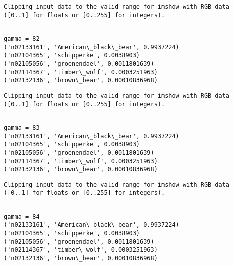 \documentclass[11pt]{article}
\begin{document}
    \begin{Verbatim}[commandchars=\\\{\}]
Clipping input data to the valid range for imshow with RGB data ([0..1] for floats or [0..255] for integers).

    \end{Verbatim}

    \begin{Verbatim}[commandchars=\\\{\}]

gamma = 82
('n02133161', 'American\_black\_bear', 0.9937224)
('n02104365', 'schipperke', 0.0038903)
('n02105056', 'groenendael', 0.0011801639)
('n02114367', 'timber\_wolf', 0.0003251963)
('n02132136', 'brown\_bear', 0.00010836968)

    \end{Verbatim}

    \begin{Verbatim}[commandchars=\\\{\}]
Clipping input data to the valid range for imshow with RGB data ([0..1] for floats or [0..255] for integers).

    \end{Verbatim}

    \begin{Verbatim}[commandchars=\\\{\}]

gamma = 83
('n02133161', 'American\_black\_bear', 0.9937224)
('n02104365', 'schipperke', 0.0038903)
('n02105056', 'groenendael', 0.0011801639)
('n02114367', 'timber\_wolf', 0.0003251963)
('n02132136', 'brown\_bear', 0.00010836968)

    \end{Verbatim}

    \begin{Verbatim}[commandchars=\\\{\}]
Clipping input data to the valid range for imshow with RGB data ([0..1] for floats or [0..255] for integers).

    \end{Verbatim}

    \begin{Verbatim}[commandchars=\\\{\}]

gamma = 84
('n02133161', 'American\_black\_bear', 0.9937224)
('n02104365', 'schipperke', 0.0038903)
('n02105056', 'groenendael', 0.0011801639)
('n02114367', 'timber\_wolf', 0.0003251963)
('n02132136', 'brown\_bear', 0.00010836968)

    \end{Verbatim}
\end{document}
